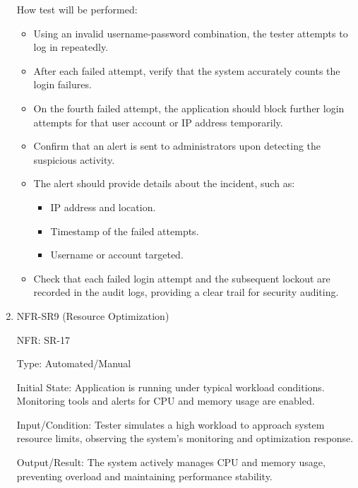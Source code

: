 \documentclass[12pt, titlepage]{article}
\begin{document}
\begin{enumerate}
  How test will be performed: 
  \begin{itemize}
    \item Using an invalid username-password combination, the tester attempts to
    log in repeatedly.
    \item After each failed attempt, verify that the system accurately counts
    the login failures.
    \item On the fourth failed attempt, the application should block further
    login attempts for that user account or IP address temporarily.
    \item  Confirm that an alert is sent to administrators upon detecting the
    suspicious activity.
    \item The alert should provide details about the incident, such as:
    \begin{itemize}
      \item IP address and location.
      \item Timestamp of the failed attempts.
      \item Username or account targeted.
    \end{itemize}
    \item Check that each failed login attempt and the subsequent lockout are
    recorded in the audit logs, providing a clear trail for security auditing.
  \end{itemize}

\item{NFR-SR9 (Resource Optimization)\\}
  
  NFR: SR-17
  
  Type: Automated/Manual
  
  Initial State: Application is running under typical workload conditions.
  Monitoring tools and alerts for CPU and memory usage are enabled.
  
  Input/Condition: Tester simulates a high workload to approach system resource
  limits, observing the system's monitoring and optimization response.
  
  Output/Result: The system actively manages CPU and memory usage, preventing
  overload and maintaining performance stability.


\end{enumerate}
\end{document}
